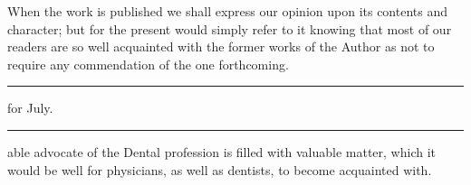 When the work is published we shall express our opinion upon its
contents and character; but for the present would simply refer to it
knowing that most of our readers are so well acquainted with the former
works of the Author as not to require any commendation of the one
forthcoming.

\fancybreak{* * *}

 for July.
\plainbreak{1}
\normalsize

 able advocate of the Dental profession is filled with valuable
matter, which it would be well for physicians, as well as dentists, to
become acquainted with.\endinput
